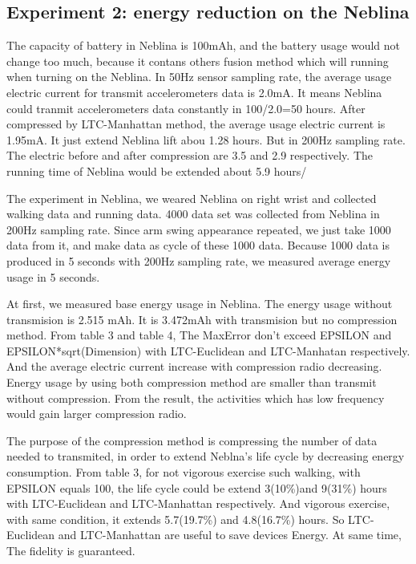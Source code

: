 \documentclass[10pt, conference, compsocconf]{IEEEtran}
\begin{document}
\subsection{Experiment 2: energy reduction on the Neblina}

The capacity of battery in Neblina is 100mAh, and the battery usage would not change too much, because it contans others fusion method which will running when turning on the Neblina.
In 50Hz sensor sampling rate, the average usage electric current for transmit accelerometers data is 2.0mA. It means Neblina could tranmit accelerometers data constantly in 100/2.0=50 hours.
After compressed by LTC-Manhattan method, the average usage electric current is 1.95mA. It just extend Neblina lift abou 1.28 hours.
But in 200Hz sampling rate. The electric before and after compression are 3.5 and 2.9 respectively. The running time of Neblina would be extended about 5.9 hours/

The experiment in Neblina, we weared Neblina on right wrist and
collected walking data and running data. 4000 data set was collected
from Neblina in 200Hz sampling rate. Since arm swing appearance
repeated, we just take 1000 data from it, and make data as cycle of
these 1000 data. Because 1000 data is produced in 5 seconds with 200Hz
sampling rate, we measured average energy usage in 5 seconds.

At first, we measured base energy usage in Neblina. The energy usage
without transmision is 2.515 mAh. It is 3.472mAh with transmision but
no compression method. From table 3 and table 4, The MaxError don't exceed EPSILON
and EPSILON*sqrt(Dimension) with LTC-Euclidean and LTC-Manhatan respectively.
And the average electric current increase with compression radio decreasing.
Energy usage by using both compression method are smaller than transmit
without compression. From the result, the activities which has low frequency
would gain larger compression radio.

The purpose of the compression method is compressing the number of
data needed to transmited, in order to extend Neblna's life cycle
by decreasing energy consumption. From table 3, for not vigorous exercise
such walking, with EPSILON equals 100, the life cycle could be extend
3(10\%)and 9(31\%) hours with LTC-Euclidean and LTC-Manhattan respectively.
And vigorous exercise, with same condition, it extends 5.7(19.7\%)
and 4.8(16.7\%) hours. So LTC-Euclidean and LTC-Manhattan are useful
to save devices Energy. At same time, The fidelity is guaranteed.
\end{document}
